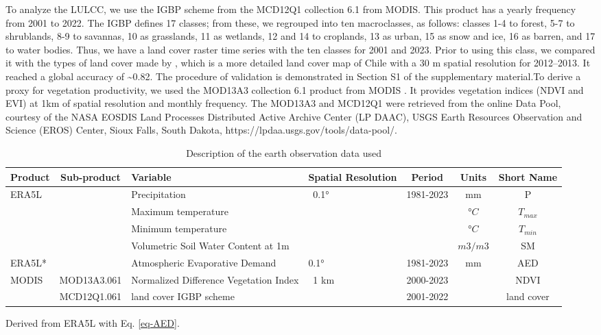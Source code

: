 \documentclass[
  authoryear,
  preprint,
  3p,
  onecolumn]{elsarticle}
\begin{document}
To analyze the LULCC, we use the IGBP scheme from the MCD12Q1 collection
6.1 from MODIS. This product has a yearly frequency from 2001 to 2022.
The IGBP defines 17 classes; from these, we regrouped into ten
macroclasses, as follows: classes 1-4 to forest, 5-7 to shrublands, 8-9
to savannas, 10 as grasslands, 11 as wetlands, 12 and 14 to croplands,
13 as urban, 15 as snow and ice, 16 as barren, and 17 to water bodies.
Thus, we have a land cover raster time series with the ten classes for
2001 and 2023. Prior to using this class, we compared it with the types
of land cover made by \citet{Zhao2016}, which is a more detailed land
cover map of Chile with a 30 m spatial resolution for 2012--2013. It
reached a global accuracy of \textasciitilde0.82. The procedure of
validation is demonstrated in Section S1 of the supplementary
material.To derive a proxy for vegetation productivity, we used the
MOD13A3 collection 6.1 product from MODIS \citep{Didan2015}. It provides
vegetation indices (NDVI and EVI) at 1km of spatial resolution and
monthly frequency. The MOD13A3 and MCD12Q1 were retrieved from the
online Data Pool, courtesy of the NASA EOSDIS Land Processes Distributed
Active Archive Center (LP DAAC), USGS Earth Resources Observation and
Science (EROS) Center, Sioux Falls, South Dakota,
https://lpdaa.usgs.gov/tools/data-pool/.

\begin{table}[!ht]
\caption{Description of the earth observation data used }
\label{tab-desEOD}
\small
\centering
\begin{tabular}{p{}cp{}p{}ccc}
\hline
\multirow{1}{*}{\centering Product} & Sub-product & Variable & Spatial Resolution  & Period & Units & Short Name \\ 
\hline
\multirow{4}{*}{ERA5L} & ~ & Precipitation & \multirow{4}{*}{~0.1°} & \multirow{4}{*}{1981-2023} & mm & P \\ 
         &  & Maximum temperature & ~ & & $°C$ & $T_{max}$ \\ 
         &  & Minimum temperature & ~ & & $°C$ & $T_{min}$ \\ 
         &  & Volumetric Soil Water Content at 1m & ~ & & $m3/m3$ & SM \\ 
ERA5L* & & Atmospheric Evaporative Demand & 0.1° & 1981-2023 & mm & AED \\
        \multirow{2}{*}{MODIS} & MOD13A3.061 & Normalized Difference Vegetation Index & \multirow{2}{*}{~1 km} & 2000-2023 & ~ & NDVI \\ 
         & MCD12Q1.061 & land cover IGBP scheme & & 2001-2022 & ~ & land cover \\ 
\hline
\end{tabular}
{\raggedright *Derived from ERA5L with Eq. \ref{eq-AED}. \par}
\end{table}
\end{document}

